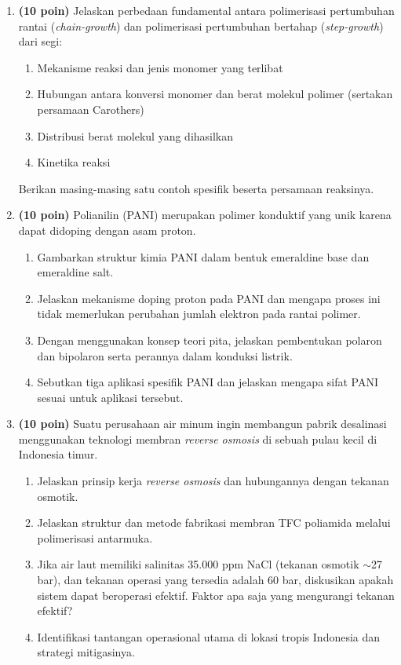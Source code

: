 \documentclass[12pt,a4paper,openany]{book}
\begin{document}
\begin{enumerate}

\item \textbf{(10 poin)} Jelaskan perbedaan fundamental antara polimerisasi pertumbuhan rantai (\textit{chain-growth}) dan polimerisasi pertumbuhan bertahap (\textit{step-growth}) dari segi:
\begin{enumerate}[label=(\alph*)]
\item Mekanisme reaksi dan jenis monomer yang terlibat
\item Hubungan antara konversi monomer dan berat molekul polimer (sertakan persamaan Carothers)
\item Distribusi berat molekul yang dihasilkan
\item Kinetika reaksi
\end{enumerate}
Berikan masing-masing satu contoh spesifik beserta persamaan reaksinya.

\item \textbf{(10 poin)} Polianilin (PANI) merupakan polimer konduktif yang unik karena dapat didoping dengan asam proton.
\begin{enumerate}[label=(\alph*)]
\item Gambarkan struktur kimia PANI dalam bentuk emeraldine base dan emeraldine salt.
\item Jelaskan mekanisme doping proton pada PANI dan mengapa proses ini tidak memerlukan perubahan jumlah elektron pada rantai polimer.
\item Dengan menggunakan konsep teori pita, jelaskan pembentukan polaron dan bipolaron serta perannya dalam konduksi listrik.
\item Sebutkan tiga aplikasi spesifik PANI dan jelaskan mengapa sifat PANI sesuai untuk aplikasi tersebut.
\end{enumerate}

\item \textbf{(10 poin)} Suatu perusahaan air minum ingin membangun pabrik desalinasi menggunakan teknologi membran \textit{reverse osmosis} di sebuah pulau kecil di Indonesia timur.
\begin{enumerate}[label=(\alph*)]
\item Jelaskan prinsip kerja \textit{reverse osmosis} dan hubungannya dengan tekanan osmotik.
\item Jelaskan struktur dan metode fabrikasi membran TFC poliamida melalui polimerisasi antarmuka.
\item Jika air laut memiliki salinitas 35.000 ppm NaCl (tekanan osmotik $\sim$27 bar), dan tekanan operasi yang tersedia adalah 60 bar, diskusikan apakah sistem dapat beroperasi efektif. Faktor apa saja yang mengurangi tekanan efektif?
\item Identifikasi tantangan operasional utama di lokasi tropis Indonesia dan strategi mitigasinya.
\end{enumerate}


\end{enumerate}
\end{document}
